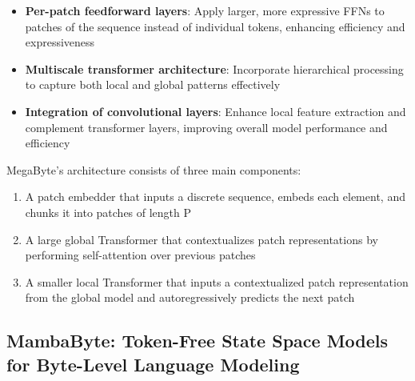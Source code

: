 \documentclass[a4paper, 11pt, twoside, openright]{report}
\begin{document}
\begin{itemize}
    \item \textbf{Per-patch feedforward layers}: Apply larger, more expressive FFNs to patches of the sequence instead of individual tokens, enhancing efficiency and expressiveness
    \item \textbf{Multiscale transformer architecture}: Incorporate hierarchical processing to capture both local and global patterns effectively
    \item \textbf{Integration of convolutional layers}: Enhance local feature extraction and complement transformer layers, improving overall model performance and efficiency
\end{itemize}

MegaByte's architecture consists of three main components:
\begin{enumerate}
    \item A patch embedder that inputs a discrete sequence, embeds each element, and chunks it into patches of length P
    \item A large global Transformer that contextualizes patch representations by performing self-attention over previous patches
    \item A smaller local Transformer that inputs a contextualized patch representation from the global model and autoregressively predicts the next patch
\end{enumerate}

\subsection{MambaByte: Token-Free State Space Models for Byte-Level Language Modeling}
\end{document}
